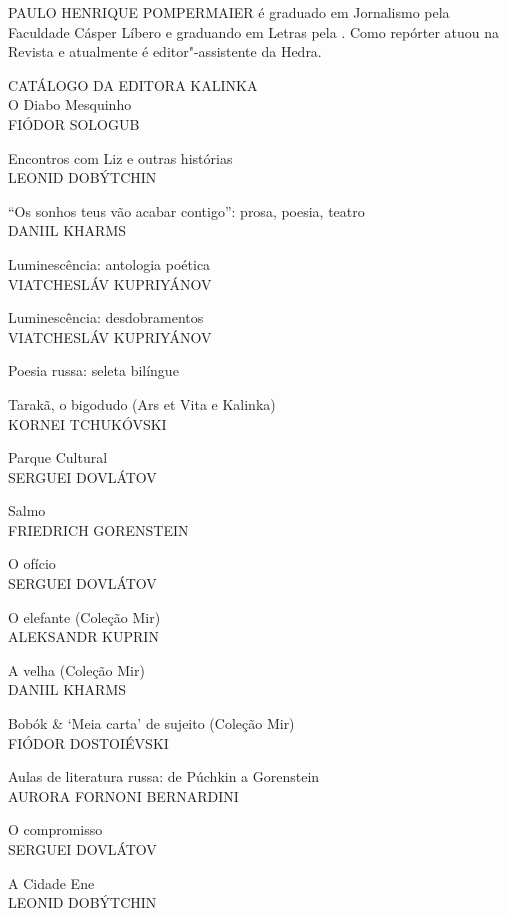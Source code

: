 \medskip

\noindent{}PAULO HENRIQUE POMPERMAIER é graduado em Jornalismo pela Faculdade Cásper Líbero e graduando em Letras pela . Como repórter atuou na Revista {} e atualmente é editor"-assistente da Hedra.

\afterpage{\blankpage}

\newpage
\pagestyle{empty}
\MyriadPro

\footnotesize{
\noindent{}CATÁLOGO DA EDITORA KALINKA\\[5pt]

\noindent{}O Diabo Mesquinho\\
FIÓDOR SOLOGUB
\medskip

\noindent{}Encontros com Liz e outras histórias\\
LEONID DOBÝTCHIN
\medskip

\noindent{}“Os sonhos teus vão acabar contigo”: prosa, poesia, teatro\\
DANIIL KHARMS
\medskip

\noindent{}Luminescência: antologia poética\\
VIATCHESLÁV KUPRIYÁNOV
\medskip

\noindent{}Luminescência: desdobramentos\\
VIATCHESLÁV KUPRIYÁNOV
\medskip

\noindent{}Poesia russa: seleta bilíngue
\medskip

\noindent{}Tarakã, o bigodudo (Ars et Vita e Kalinka)\\
KORNEI TCHUKÓVSKI
\medskip

\noindent{}Parque Cultural\\
SERGUEI DOVLÁTOV
\medskip

\noindent{}Salmo\\
FRIEDRICH GORENSTEIN
\medskip

\noindent{}O ofício\\
SERGUEI DOVLÁTOV
\medskip

\noindent{}O elefante (Coleção Mir)\\
ALEKSANDR KUPRIN
\medskip

\noindent{}A velha (Coleção Mir)\\
DANIIL KHARMS 
\medskip

\noindent{}Bobók \& ‘Meia carta’ de sujeito (Coleção Mir)\\
FIÓDOR DOSTOIÉVSKI
\medskip

\noindent{}Aulas de literatura russa: de Púchkin a Gorenstein \\
AURORA FORNONI BERNARDINI
\medskip

\noindent{}O compromisso\\
SERGUEI DOVLÁTOV
\medskip

\noindent{}A Cidade Ene \\
LEONID DOBÝTCHIN
}

